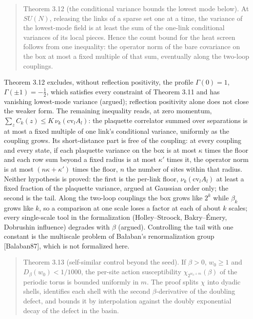 \documentclass[10pt,letterpaper,twocolumn]{article}
\begin{document}
\begin{quote}
Theorem 3.12 (the conditional variance bounds the lowest mode below). At \(SU(N)\), releasing the links of a sparse set one at a time, the variance of the lowest-mode field is at least the sum of the one-link conditional variances of its local pieces. Hence the count bound for the heat screen follows from one inequality: the operator norm of the bare covariance on the box at most a fixed multiple of that sum, eventually along the two-loop couplings.
\end{quote}

Theorem 3.12 excludes, without reflection positivity, the profile \(\Gamma(0)=1\), \(\Gamma(\pm1)=-\tfrac12\), which satisfies every constraint of Theorem 3.11 and has vanishing lowest-mode variance (argued); reflection positivity alone does not close the weaker form. The remaining inequality reads, at zero momentum, \(\sum_zC_k(z)\le K\,\nu_k(\mathrm{cv}_lA_l)\): the plaquette correlator summed over separations is at most a fixed multiple of one link's conditional variance, uniformly as the coupling grows. Its short-distance part is free of the coupling: at every coupling and every state, if each plaquette variance on the box is at most \(\kappa\) times the floor and each row sum beyond a fixed radius is at most \(\kappa'\) times it, the operator norm is at most \((n\kappa+\kappa')\) times the floor, \(n\) the number of sites within that radius. Neither hypothesis is proved: the first is the per-link floor, \(\nu_k(\mathrm{cv}_lA_l)\) at least a fixed fraction of the plaquette variance, argued at Gaussian order only; the second is the tail. Along the two-loop couplings the box grows like \(2^k\) while \(\beta_k\) grows like \(k\), so a comparison at one scale loses a factor at each of about \(k\) scales; every single-scale tool in the formalization (Holley--Stroock, Bakry--Émery, Dobrushin influence) degrades with \(\beta\) (argued). Controlling the tail with one constant is the multiscale problem of Bałaban's renormalization group {[}Balaban87{]}, which is not formalized here.

\begin{quote}
Theorem 3.13 (self-similar control beyond the seed). If \(\beta>0\), \(w_0\ge1\) and \(D_\beta(w_0)<1/1000\), the per-site action susceptibility \(\chi_{2^{w_0+m}}(\beta)\) of the periodic torus is bounded uniformly in \(m\). The proof splits \(\chi\) into dyadic shells, identifies each shell with the second \(\beta\)-derivative of the doubling defect, and bounds it by interpolation against the doubly exponential decay of the defect in the basin.
\end{quote}
\end{document}
